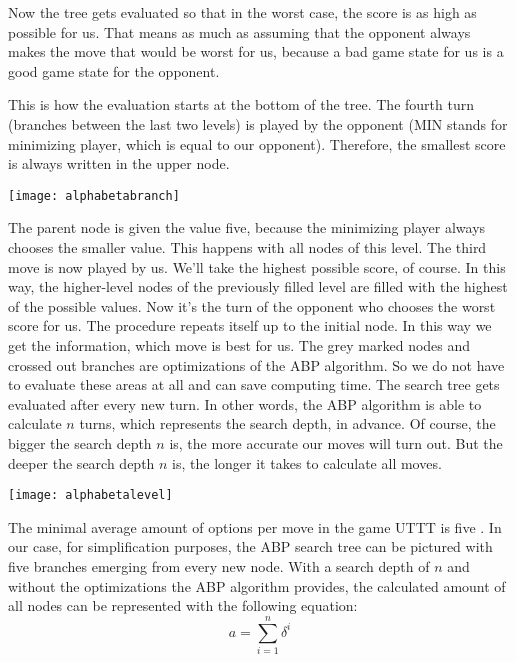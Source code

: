 Now the tree gets evaluated so that in the worst case, the score is as high as possible for us.
That means as much as assuming that the opponent always makes the move that would be worst for us, because a bad game state for us is a good game state for the opponent. 

This is how the evaluation starts at the bottom of the tree. The fourth turn (branches between the last two levels) is played by the opponent (MIN stands for minimizing player, which is equal to our opponent). Therefore, the smallest score is always written in the upper node.\\
\begin{fixedpic}
	\centering
	\texttt{[image: alphabetabranch]}
\end{fixedpic}
The parent node is given the value five, because the minimizing player always chooses the smaller value. This happens with all nodes of this level. The third move is now played by us. We'll take the highest possible score, of course. In this way, the higher-level nodes of the previously filled level are filled with the highest of the possible values. Now it's the turn of the opponent who chooses the worst score for us. The procedure repeats itself up to the initial node. In this way we get the information, which move is best for us. The grey marked nodes and crossed out branches are optimizations of the \ac{ABP} algorithm. So we do not have to evaluate these areas at all and can save computing time.
The search tree gets evaluated after every new turn. In other words, the \ac{ABP} algorithm is able to calculate $n$ turns, which represents the search depth, in advance. Of course, the bigger the search depth $n$ is, the more accurate our moves will turn out. But the deeper the search depth $n$ is, the longer it takes to calculate all moves.

\begin{fixedpic}
	\centering
	\texttt{[image: alphabetalevel]}
\end{fixedpic}

The minimal average amount of options per move in the game \ac{UTTT} is five \cite[p.~1-2]{web:amar2013}.
In our case, for simplification purposes, the \ac{ABP} search tree can be pictured with five branches emerging from every new node. With a search depth of $n$ and without the optimizations the \ac{ABP} algorithm provides, the calculated amount of all nodes can be represented with the following equation:  $$a = \sum_{i=1}^{n} \delta^{i}$$

